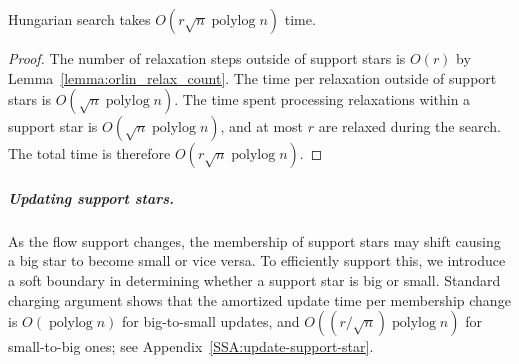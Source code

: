 \documentclass[a4paper,UKenglish]{socg-lipics-v2018}
\def\polylog{\mathop{\mathrm{polylog}}}
\theoremstyle{plain}
\numberwithin{figure}{section}
\renewcommand{\paragraph}{\subparagraph}
\begin{document}
\begin{lemmarep}
\label{lemma:orlin_hs_time}
Hungarian search takes $O(r\sqrt{n}\polylog n)$ time.
\end{lemmarep}

\begin{proof}
The number of relaxation steps outside of support stars is $O(r)$ by
Lemma~\ref{lemma:orlin_relax_count}.
The time per relaxation outside of support stars is $O(\sqrt{n}\polylog n)$.
The time spent processing relaxations within a support star is
$O(\sqrt{n}\polylog n)$, and at most $r$ are relaxed during the search.
The total time is therefore $O(r\sqrt{n}\polylog n)$.
\end{proof}

\paragraph{Updating support stars.}
As the flow support changes, the membership of support stars may shift causing
a big star to become small or vice versa.
To efficiently support this, we introduce a soft boundary in determining whether a support star is big or small.
%
Standard charging argument shows that the amortized update time per membership
change is $O(\polylog n)$ for big-to-small updates, and
$O((r/\sqrt{n})\polylog n)$ for small-to-big ones;
see Appendix~\ref{SSA:update-support-star}.
%
\end{document}
